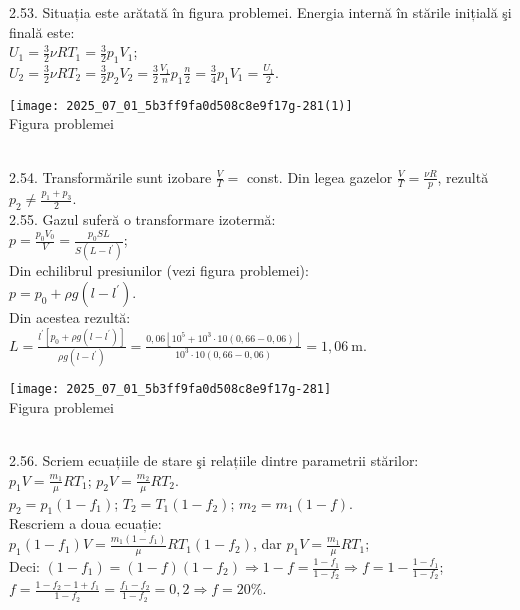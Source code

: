 2.53. Situația este arătată în figura problemei. Energia internă în stările inițială şi finală este:\\ $U_{1}=\frac{3}{2} \nu R T_{1}=\frac{3}{2} p_{1} V_{1}$;\\ $U_{2}=\frac{3}{2} \nu R T_{2}=\frac{3}{2} p_{2} V_{2}=\frac{3}{2} \frac{V_{1}}{n} p_{1} \frac{n}{2}=\frac{3}{4} p_{1} V_{1}=\frac{U_{1}}{2}$.\\ \begin{center} \texttt{[image: 2025\_07\_01\_5b3ff9fa0d508c8e9f17g-281(1)]}\\ Figura problemei \end{center}\\

2.54. Transformările sunt izobare $\frac{V}{T}=$ const. Din legea gazelor $\frac{V}{T}=\frac{\nu R}{p}$, rezultă $p_{2} \neq \frac{p_{1}+p_{3}}{2}$.\\

2.55. Gazul suferă o transformare izotermă:\\ $p=\frac{p_{0} V_{0}}{V}=\frac{p_{0} S L}{S\left(L-l^{\prime}\right)}$;\\ Din echilibrul presiunilor (vezi figura problemei):\\ $p=p_{0}+\rho g\left(l-l^{\prime}\right)$.\\ Din acestea rezultă:\\ $L=\frac{l^{\prime}\left[p_{0}+\rho g\left(l-l^{\prime}\right)\right]}{\rho g\left(l-l^{\prime}\right)}=\frac{0,06\left\lfloor 10^{5}+10^{3} \cdot 10(0,66-0,06)\right\rfloor}{10^{3} \cdot 10(0,66-0,06)}=1,06 \mathrm{~m}$.\\ \begin{center} \texttt{[image: 2025\_07\_01\_5b3ff9fa0d508c8e9f17g-281]}\\ Figura problemei \end{center}\\

2.56. Scriem ecuațiile de stare şi relațiile dintre parametrii stărilor:\\ $p_{1} V=\frac{m_{1}}{\mu} R T_{1}$; \quad $p_{2} V=\frac{m_{2}}{\mu} R T_{2}$.\\ $p_{2}=p_{1}\left(1-f_{1}\right)$; \quad $T_{2}=T_{1}\left(1-f_{2}\right)$; \quad $m_{2}=m_{1}(1-f)$.\\ Rescriem a doua ecuație:\\ $p_{1}\left(1-f_{1}\right) V=\frac{m_{1}\left(1-f_{1}\right)}{\mu} R T_{1}\left(1-f_{2}\right)$, dar $p_{1} V=\frac{m_{1}}{\mu} R T_{1}$;\\ Deci: $\left(1-f_{1}\right)=(1-f)\left(1-f_{2}\right) \Rightarrow 1-f=\frac{1-f_{1}}{1-f_{2}} \Rightarrow f=1-\frac{1-f_{1}}{1-f_{2}}$;\\ $f=\frac{1-f_{2}-1+f_{1}}{1-f_{2}}=\frac{f_{1}-f_{2}}{1-f_{2}}=0,2 \Rightarrow f=20 \%$.\\

